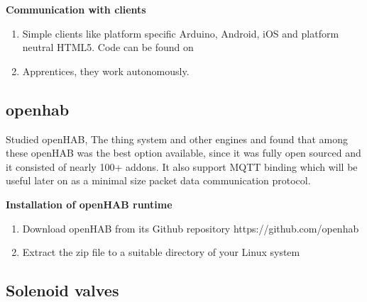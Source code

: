 \documentclass[16pt]{article}
\begin{document}
\vspace{0.5cm}

{\Large{\textbf{Communication with
clients}}}


\begin{enumerate}


\item
  Simple clients like platform specific Arduino, Android, iOS and
  platform neutral HTML5. Code can be found on
\item
  Apprentices, they work autonomously.
  
\end{enumerate}






\subsection{openhab}


Studied openHAB, The thing system and other engines and found that among these openHAB was the best option available, since it was fully open sourced and it
consisted of nearly 100+ addons. It also support MQTT binding which will be useful later on as a minimal size packet data communication protocol.

\hfill

\textbf{Installation of openHAB runtime}

\begin{enumerate}

  \item Download openHAB from its Github repository https://github.com/openhab
  \item Extract the zip file to a suitable directory of your Linux system

\end{enumerate}

\subsection{Solenoid valves}
\end{document}
